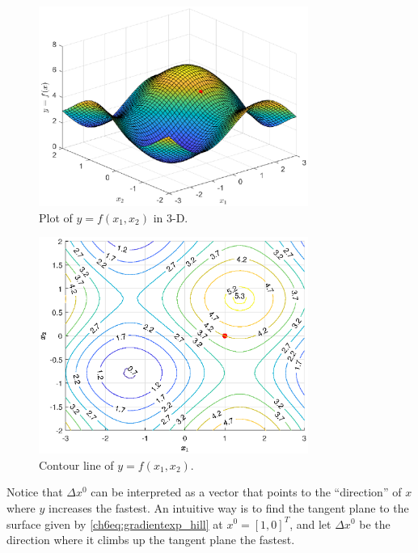 \begin{figure}
	\centering
	\includegraphics[width=250pt]{chapters/part-2/figures/gradientexp_3d.eps}
	\caption{Plot of $y=f(x_1, x_2)$ in 3-D.} \label{ch6fig:gradientexp_3d}
\end{figure}
\begin{figure}
	\centering
	\includegraphics[width=250pt]{chapters/part-2/figures/gradientexp_contour.eps}
	\caption{Contour line of $y=f(x_1, x_2)$.} \label{ch6fig:gradientexp_contour}
\end{figure}

Notice that $\Delta x^0$ can be interpreted as a vector that points to the ``direction'' of $x$ where $y$ increases the fastest. An intuitive way is to find the tangent plane to the surface given by \eqref{ch6eq:gradientexp_hill} at $x^0=[1,0]^T$, and let $\Delta x^0$ be the direction where it climbs up the tangent plane the fastest.

